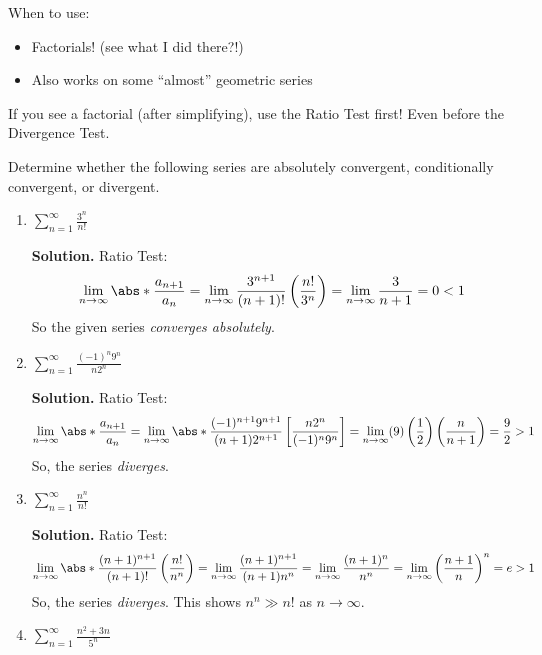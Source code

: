 \begin{Remark}{}{}
    When to use:
    \begin{itemize}
        \item Factorials! (see what I did there?!)
        \item Also works on some ``almost'' geometric series
    \end{itemize}
    If you see a factorial (after simplifying), use the Ratio Test first! Even
    before the Divergence Test.
\end{Remark}

\begin{Example}{}{}
    Determine whether the following series are absolutely convergent,
    conditionally convergent, or divergent.
    \begin{enumerate}[label=(\roman*)]
        \item $ \displaystyle \sum\limits_{n=1}^{\infty} \frac{3^n}{n!} $

              \textbf{Solution.} Ratio Test:
              \[ \lim\limits_{{n} \to {\infty}} \abs*{\frac{a_{n+1}}{a_n}}=
                  \lim\limits_{{n} \to {\infty}} \frac{3^{n+1}}{(n+1)!}\left( \frac{n!}{3^n} \right)
                  =\lim\limits_{{n} \to {\infty}} \frac{3}{n+1}=0<1 \]
              So the given series \emph{converges absolutely}.
        \item $ \displaystyle \sum\limits_{n=1}^{\infty} \frac{(-1)^n9^n}{n2^n} $

              \textbf{Solution.} Ratio Test:
              \[ \lim\limits_{{n} \to {\infty}} \abs*{\frac{a_{n+1}}{a_n}}=
                  \lim\limits_{{n} \to {\infty}}
                  \abs*{\frac{(-1)^{n+1}9^{n+1}}{(n+1)2^{n+1}}
                  \left[ \frac{n2^n}{(-1)^n9^n} \right]}
                  =\lim\limits_{{n} \to {\infty}} (9)\left( \frac{1}{2} \right)
                  \left( \frac{n}{n+1} \right)
                  =\frac{9}{2} >1 \]
              So, the series \emph{diverges}.
        \item $ \displaystyle \sum\limits_{n=1}^{\infty}\frac{n^n}{n!} $

              \textbf{Solution.} Ratio Test:
              \[ \lim\limits_{{n} \to {\infty}} \abs*{\frac{(n+1)^{n+1}}{(n+1)!}
                      \left( \frac{n!}{n^n} \right)}
                  =\lim\limits_{{n} \to {\infty}} \frac{(n+1)^{n+1}}{(n+1)n^n}
                  =\lim\limits_{{n} \to {\infty}} \frac{(n+1)^n}{n^n}
                  =\lim\limits_{{n} \to {\infty}} \left( \frac{n+1}{n}  \right)^n=e>1  \]
              So, the series \emph{diverges}. This shows $ n^n\gg n! $ as $ n\to\infty $.
        \item $ \displaystyle \sum\limits_{n=1}^{\infty} \frac{n^2+3n}{5^n}  $


\end{enumerate}
\end{Example}
